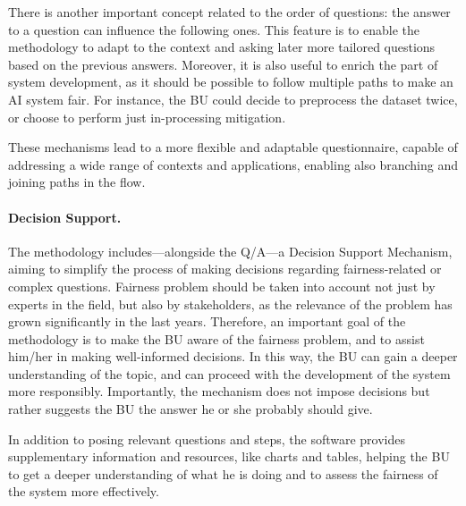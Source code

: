 \documentclass[12pt,a4paper,openright,twoside]{book}
\begin{document}
There is another important concept related to the order of questions: the answer to a question can influence the following ones.
%
This feature is to enable the methodology to adapt to the context and asking later more tailored questions based on the previous answers.
%
Moreover, it is also useful to enrich the part of system development, as it should be possible to follow multiple paths to make an AI system fair.
%
For instance, the \acl{BU} could decide to preprocess the dataset twice, or choose to perform just in-processing mitigation.

These mechanisms lead to a more flexible and adaptable questionnaire, capable of addressing a wide range of contexts and applications, enabling also branching and joining paths in the flow.



\paragraph{Decision Support.}
The methodology includes---alongside the \ac{Q/A}---a Decision Support Mechanism, aiming to simplify the process of making decisions regarding fairness-related or complex questions.
%
Fairness problem should be taken into account not just by experts in the field, but also by stakeholders, as the relevance of the problem has grown significantly in the last years.
%
Therefore, an important goal of the methodology is to make the \ac{BU} aware of the fairness problem, and to assist him/her in making well-informed decisions.
%
In this way, the \ac{BU} can gain a deeper understanding of the topic, and can proceed with the development of the system more responsibly.
%
Importantly, the mechanism does not impose decisions but rather suggests the \ac{BU} the answer he or she probably should give.

In addition to posing relevant questions and steps, the software provides supplementary information and resources, like charts and tables, helping the \ac{BU} to get a deeper understanding of what he is doing and to assess the fairness of the system more effectively.
\end{document}
